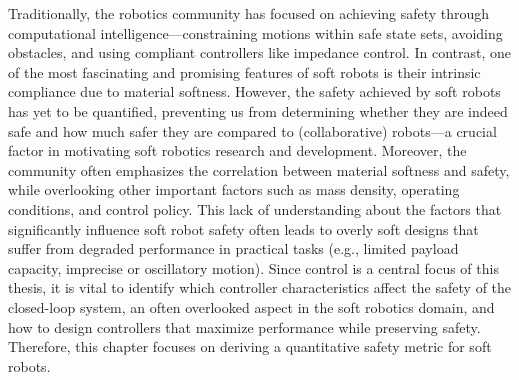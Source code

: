 \begin{foreword}
    Traditionally, the robotics community has focused on achieving safety through computational intelligence—constraining motions within safe state sets, avoiding obstacles, and using compliant controllers like impedance control. In contrast, one of the most fascinating and promising features of soft robots is their intrinsic compliance due to material softness. However, the safety achieved by soft robots has yet to be quantified, preventing us from determining whether they are indeed safe and how much safer they are compared to (collaborative) robots—a crucial factor in motivating soft robotics research and development. Moreover, the community often emphasizes the correlation between material softness and safety, while overlooking other important factors such as mass density, operating conditions, and control policy. This lack of understanding about the factors that significantly influence soft robot safety often leads to overly soft designs that suffer from degraded performance in practical tasks (e.g., limited payload capacity, imprecise or oscillatory motion). Since control is a central focus of this thesis, it is vital to identify which controller characteristics affect the safety of the closed-loop system, an often overlooked aspect in the soft robotics domain, and how to design controllers that maximize performance while preserving safety. Therefore, this chapter focuses on deriving a quantitative safety metric for soft robots.
\end{foreword}

